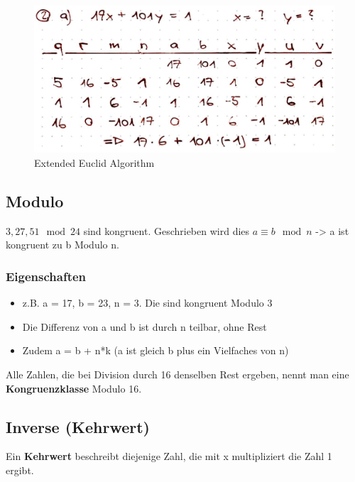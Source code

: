 \begin{figure}[H]
\centering
\includegraphics[width=1\textwidth]{figures/extendedEuclidAlgorithm.png}
\caption{Extended Euclid Algorithm}
\end{figure}

\hypertarget{modulo}{%
\subsection{Modulo}\label{modulo}}

$3, 27, 51 \mod 24$ sind kongruent. Geschrieben wird dies \textbf{$a \equiv b \mod n$} -> a ist kongruent zu b Modulo n.

\hypertarget{eigenschaften}{%
\subsubsection{Eigenschaften}\label{eigenschaften}}

\begin{itemize}
\tightlist
\item
  z.B. a = 17, b = 23, n = 3. Die sind kongruent Modulo 3
\item
  Die Differenz von a und b ist durch n teilbar, ohne Rest
\item
  Zudem a = b + n*k (a ist gleich b plus ein Vielfaches von n)
\end{itemize}

Alle Zahlen, die bei Division durch 16 denselben Rest ergeben, nennt man
eine \textbf{Kongruenzklasse} Modulo 16.

\hypertarget{inverse-kehrwert}{%
\subsection{Inverse (Kehrwert)}\label{inverse-kehrwert}}

Ein \textbf{Kehrwert} beschreibt diejenige Zahl, die mit x multipliziert
die Zahl 1 ergibt.

